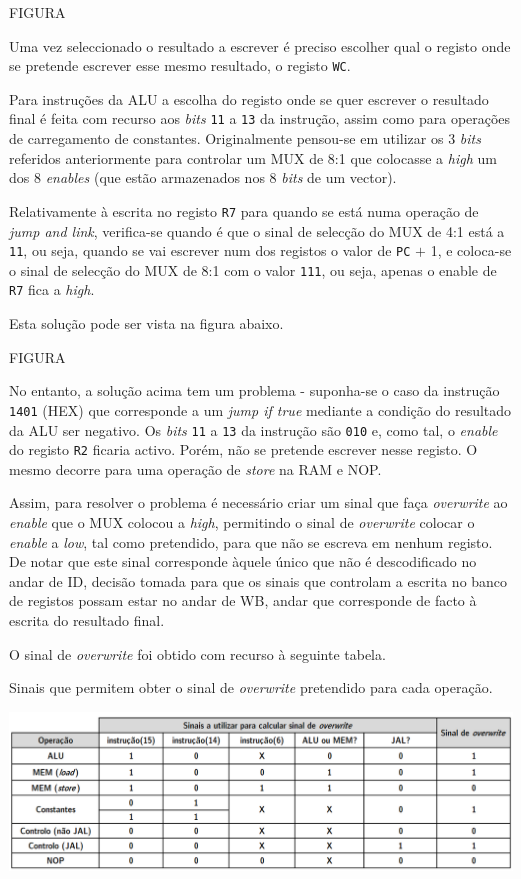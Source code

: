 \documentclass[11pt]{article}
\numberwithin{equation}{section}
\begin{document}
FIGURA

Uma vez seleccionado o resultado a escrever é preciso escolher qual o registo onde se pretende escrever esse mesmo resultado, o registo \texttt{WC}. 

Para instruções da ALU a escolha do registo onde se quer escrever o resultado final é feita com recurso aos \textit{bits} \texttt{11} a \texttt{13} da instrução, assim como para operações de carregamento de constantes. Originalmente pensou-se em utilizar os 3 \textit{bits} referidos anteriormente para controlar um MUX de 8:1 que colocasse a \textit{high} um dos 8 \textit{enables} (que estão armazenados nos 8 \textit{bits} de um vector).

Relativamente à escrita no registo \texttt{R7} para quando se está numa operação de \textit{jump and link}, verifica-se quando é que o sinal de selecção do MUX de 4:1 está a \texttt{11}, ou seja, quando se vai escrever num dos registos o valor de \texttt{PC} $+$ 1, e coloca-se o sinal de selecção do MUX de 8:1 com o valor \texttt{111}, ou seja, apenas o enable de \texttt{R7} fica a \textit{high}.

Esta solução pode ser vista na figura abaixo.

FIGURA

No entanto, a solução acima tem um problema - suponha-se o caso da instrução \texttt{1401} (HEX) que corresponde a um \textit{jump if true} mediante a condição do resultado da ALU ser negativo. Os \textit{bits} \texttt{11} a \texttt{13} da instrução são \texttt{010} e, como tal, o \textit{enable} do registo \texttt{R2} ficaria activo. Porém, não se pretende escrever nesse registo. O mesmo decorre para uma operação de \textit{store} na RAM e NOP. 

Assim, para resolver o problema é necessário criar um sinal que faça \textit{overwrite} ao \textit{enable} que o MUX colocou a \textit{high}, permitindo o sinal de \textit{overwrite} colocar o \textit{enable} a \textit{low}, tal como pretendido, para que não se escreva em nenhum registo. De notar que este sinal corresponde àquele único que não é descodificado no andar de ID, decisão tomada para que os sinais que controlam a escrita no banco de registos possam estar no andar de WB, andar que corresponde de facto à escrita do resultado final.

O sinal de \textit{overwrite} foi obtido com recurso à seguinte tabela.

\vspace{1.5mm}
\begin{table}[h]
	\centering
	\caption{Sinais que permitem obter o sinal de \textit{overwrite} pretendido para cada operação.}
	\vspace{-2mm}
 	\includegraphics[width=1\linewidth]{tabelas/tabelaWE}
\end{table}
\end{document}

